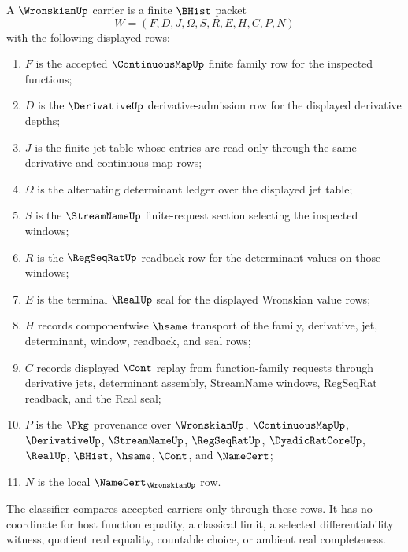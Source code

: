 \begin{definition}
\label{def:wronskian-carrier}
A $\WronskianUp$ carrier is a finite $\BHist$ packet
$$
W=(F,D,J,\Omega,S,R,E,H,C,P,N)
$$
with the following displayed rows:
\begin{enumerate}
\item $F$ is the accepted $\ContinuousMapUp$ finite family row for the inspected functions;
\item $D$ is the $\DerivativeUp$ derivative-admission row for the displayed derivative depths;
\item $J$ is the finite jet table whose entries are read only through the same derivative and continuous-map rows;
\item $\Omega$ is the alternating determinant ledger over the displayed jet table;
\item $S$ is the $\StreamNameUp$ finite-request section selecting the inspected windows;
\item $R$ is the $\RegSeqRatUp$ readback row for the determinant values on those windows;
\item $E$ is the terminal $\RealUp$ seal for the displayed Wronskian value rows;
\item $H$ records componentwise $\hsame$ transport of the family, derivative, jet, determinant, window, readback, and seal rows;
\item $C$ records displayed $\Cont$ replay from function-family requests through derivative jets, determinant assembly, StreamName windows, RegSeqRat readback, and the Real seal;
\item $P$ is the $\Pkg$ provenance over $\WronskianUp$, $\ContinuousMapUp$, $\DerivativeUp$, $\StreamNameUp$, $\RegSeqRatUp$, $\DyadicRatCoreUp$, $\RealUp$, $\BHist$, $\hsame$, $\Cont$, and $\NameCert$;
\item $N$ is the local $\NameCert_{\WronskianUp}$ row.
\end{enumerate}
The classifier compares accepted carriers only through these rows. It has no coordinate for host function equality, a classical limit, a selected differentiability witness, quotient real equality, countable choice, or ambient real completeness.
\end{definition}

